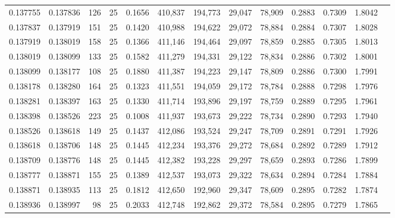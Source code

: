 \begin{tabular}{rrrrrrrrrrrrr}
0.137755 & 0.137836 &   126 &  25 &                                     0.1656 & 410,837 & 194,773 &  29,047 &  78,909 & 0.2883 & 0.7309 & 1.8042 \\
0.137837 & 0.137919 &   151 &  25 &                                     0.1420 & 410,988 & 194,622 &  29,072 &  78,884 & 0.2884 & 0.7307 & 1.8028 \\
0.137919 & 0.138019 &   158 &  25 &                                     0.1366 & 411,146 & 194,464 &  29,097 &  78,859 & 0.2885 & 0.7305 & 1.8013 \\
0.138019 & 0.138099 &   133 &  25 &                                     0.1582 & 411,279 & 194,331 &  29,122 &  78,834 & 0.2886 & 0.7302 & 1.8001 \\
0.138099 & 0.138177 &   108 &  25 &                                     0.1880 & 411,387 & 194,223 &  29,147 &  78,809 & 0.2886 & 0.7300 & 1.7991 \\
0.138178 & 0.138280 &   164 &  25 &                                     0.1323 & 411,551 & 194,059 &  29,172 &  78,784 & 0.2888 & 0.7298 & 1.7976 \\
0.138281 & 0.138397 &   163 &  25 &                                     0.1330 & 411,714 & 193,896 &  29,197 &  78,759 & 0.2889 & 0.7295 & 1.7961 \\
0.138398 & 0.138526 &   223 &  25 &                                     0.1008 & 411,937 & 193,673 &  29,222 &  78,734 & 0.2890 & 0.7293 & 1.7940 \\
0.138526 & 0.138618 &   149 &  25 &                                     0.1437 & 412,086 & 193,524 &  29,247 &  78,709 & 0.2891 & 0.7291 & 1.7926 \\
0.138618 & 0.138706 &   148 &  25 &                                     0.1445 & 412,234 & 193,376 &  29,272 &  78,684 & 0.2892 & 0.7289 & 1.7912 \\
0.138709 & 0.138776 &   148 &  25 &                                     0.1445 & 412,382 & 193,228 &  29,297 &  78,659 & 0.2893 & 0.7286 & 1.7899 \\
0.138777 & 0.138871 &   155 &  25 &                                     0.1389 & 412,537 & 193,073 &  29,322 &  78,634 & 0.2894 & 0.7284 & 1.7884 \\
0.138871 & 0.138935 &   113 &  25 &                                     0.1812 & 412,650 & 192,960 &  29,347 &  78,609 & 0.2895 & 0.7282 & 1.7874 \\
0.138936 & 0.138997 &    98 &  25 &                                     0.2033 & 412,748 & 192,862 &  29,372 &  78,584 & 0.2895 & 0.7279 & 1.7865 \\

\end{tabular}
